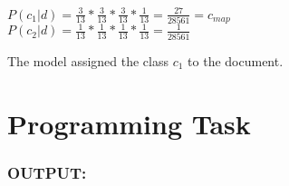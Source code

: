 \documentclass[a4paper]{scrartcl}
\begin{document}
$P(c_1|d) = \frac{3}{13} * \frac{3}{13} * \frac{3}{13} * \frac{1}{13} = \frac{27}{28561} = c_{map}$\\
$P(c_2|d) = \frac{1}{13} * \frac{1}{13} * \frac{1}{13} * \frac{1}{13} = \frac{1}{28561}$

The model assigned the class $c_1$ to the document.




\section*{Programming Task}



\subsubsection*{OUTPUT:}
\begin{lstlisting}
	
\end{lstlisting}
\end{document}
